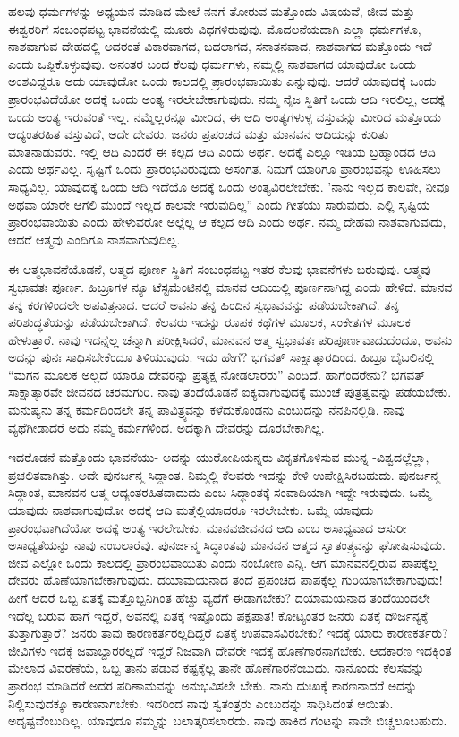 ಹಲವು ಧರ್ಮಗಳನ್ನು ಅಧ್ಯಯನ ಮಾಡಿದ ಮೇಲೆ ನನಗೆ ತೋರುವ ಮತ್ತೊಂದು ವಿಷಯವೆ, ಜೀವ ಮತ್ತು ಈಶ್ವರರಿಗೆ ಸಂಬಂಧಪಟ್ಟ ಭಾವನೆಯಲ್ಲಿ ಮೂರು ವಿಧಗಳಿರುವುವು. ಮೊದಲನೆಯದಾಗಿ ಎಲ್ಲಾ ಧರ್ಮಗಳೂ, ನಾಶವಾಗುವ ದೇಹದಲ್ಲಿ ಅದರಂತೆ ವಿಕಾರವಾಗದ, ಬದಲಾಗದ, ಸನಾತನವಾದ, ನಾಶವಾಗದ ಮತ್ತೊಂದು ಇದೆ ಎಂದು ಒಪ್ಪಿಕೊಳ್ಳುವುವು. ಅನಂತರ ಬಂದ ಕೆಲವು ಧರ್ಮಗಳು, ನಮ್ಮಲ್ಲಿ ನಾಶವಾಗದ ಯಾವುದೋ ಒಂದು ಅಂಶವಿದ್ದರೂ ಅದು ಯಾವುದೋ ಒಂದು ಕಾಲದಲ್ಲಿ ಪ್ರಾರಂಭವಾಯಿತು ಎನ್ನುವುವು. ಆದರೆ ಯಾವುದಕ್ಕೆ ಒಂದು ಪ್ರಾರಂಭವಿದೆಯೋ ಅದಕ್ಕೆ ಒಂದು ಅಂತ್ಯ ಇರಲೇಬೇಕಾಗುವುದು. ನಮ್ಮ ನೈಜ ಸ್ಥಿತಿಗೆ ಒಂದು ಆದಿ ಇರಲಿಲ್ಲ, ಅದಕ್ಕೆ ಒಂದು ಅಂತ್ಯ ಇರುವಂತೆ ಇಲ್ಲ. ನಮ್ಮೆಲ್ಲರನ್ನೂ ಮೀರಿದ, ಈ ಆದಿ ಅಂತ್ಯಗಳುಳ್ಳ ವಸ್ತುವನ್ನು ಮೀರಿದ ಮತ್ತೊಂದು ಆದ್ಯಂತರಹಿತ ವಸ್ತುವಿದೆ, ಅದೇ ದೇವರು. ಜನರು ಪ್ರಪಂಚದ ಮತ್ತು ಮಾನವನ ಆದಿಯನ್ನು ಕುರಿತು ಮಾತನಾಡುವರು. ಇಲ್ಲಿ ಆದಿ ಎಂದರೆ ಈ ಕಲ್ಪದ ಆದಿ ಎಂದು ಅರ್ಥ. ಅದಕ್ಕೆ ಎಲ್ಲೂ ಇಡಿಯ ಬ್ರಹ್ಮಾಂಡದ ಆದಿ ಎಂದು ಅರ್ಥವಿಲ್ಲ. ಸೃಷ್ಟಿಗೆ ಒಂದು ಪ್ರಾರಂಭವಿರುವುದು ಅಸಂಗತ. ನಿಮಗೆ ಯಾರಿಗೂ ಪ್ರಾರಂಭವನ್ನು ಊಹಿಸಲು ಸಾಧ್ಯವಿಲ್ಲ. ಯಾವುದಕ್ಕೆ ಒಂದು ಆದಿ ಇದೆಯೊ ಅದಕ್ಕೆ ಒಂದು ಅಂತ್ಯವಿರಲೇಬೇಕು. 'ನಾನು ಇಲ್ಲದ ಕಾಲವೇ, ನೀವೂ ಅಥವಾ ಯಾರೇ ಆಗಲಿ ಮುಂದೆ ಇಲ್ಲದ ಕಾಲವೇ ಇರುವುದಿಲ್ಲ” ಎಂದು ಗೀತೆಯು ಸಾರುವುದು. ಎಲ್ಲಿ ಸೃಷ್ಟಿಯ ಪ್ರಾರಂಭವಾಯಿತು ಎಂದು ಹೇಳುವರೋ ಅಲ್ಲೆಲ್ಲ ಆ ಕಲ್ಪದ ಆದಿ ಎಂದು ಅರ್ಥ. ನಮ್ಮ ದೇಹವು ನಾಶವಾಗುವುದು, ಆದರೆ ಆತ್ಮವು ಎಂದಿಗೂ ನಾಶವಾಗುವುದಿಲ್ಲ.

ಈ ಆತ್ಮಭಾವನೆಯೊಡನೆ, ಆತ್ಮದ ಪೂರ್ಣ ಸ್ಥಿತಿಗೆ ಸಂಬಂಧಪಟ್ಟ ಇತರ ಕೆಲವು ಭಾವನೆಗಳು ಬರುವುವು. ಆತ್ಮವು ಸ್ವಭಾವತಃ ಪೂರ್ಣ. ಹಿಬ್ರೂಗಳ ನ್ಯೂ ಟೆಸ್ಟಮೆಂಟಿನಲ್ಲಿ ಮಾನವ ಆದಿಯಲ್ಲಿ ಪೂರ್ಣನಾಗಿದ್ದ ಎಂದು ಹೇಳಿದೆ. ಮಾನವ ತನ್ನ ಕರಗಳಿಂದಲೇ ಅಪವಿತ್ರನಾದ. ಆದರೆ ಅವನು ತನ್ನ ಹಿಂದಿನ ಸ್ವಭಾವವನ್ನು ಪಡೆಯಬೇಕಾಗಿದೆ. ತನ್ನ ಪರಿಶುದ್ಧತೆಯನ್ನು ಪಡೆಯಬೇಕಾಗಿದೆ. ಕೆಲವರು ಇದನ್ನು ರೂಪಕ ಕಥೆಗಳ ಮೂಲಕ, ಸಂಕೇತಗಳ ಮೂಲಕ ಹೇಳುತ್ತಾರೆ. ನಾವು ಇದನ್ನೆಲ್ಲ ಚೆನ್ನಾಗಿ ಪರೀಕ್ಷಿಸಿದರೆ, ಮಾನವನ ಆತ್ಮ ಸ್ವಭಾವತಃ ಪರಿಪೂರ್ಣವಾದುದೆಂದೂ, ಅವನು ಅದನ್ನು ಪುನಃ ಸಾಧಿಸಬೇಕೆಂದೂ ತಿಳಿಯುವುದು. ಇದು ಹೇಗೆ? ಭಗವತ್ ಸಾಕ್ಷಾತ್ಕಾರದಿಂದ. ಹಿಬ್ರೂ ಬೈಬಲಿನಲ್ಲಿ “ಮಗನ ಮೂಲಕ ಅಲ್ಲದೆ ಯಾರೂ ದೇವರನ್ನು ಪ್ರತ್ಯಕ್ಷ ನೋಡಲಾರರು'' ಎಂದಿದೆ. ಹಾಗೆಂದರೇನು? ಭಗವತ್ ಸಾಕ್ಷಾತ್ಕಾರವೇ ಜೀವನದ ಚರಮಗುರಿ. ನಾವು ತಂದೆಯೊಡನೆ ಐಕ್ಯವಾಗುವುದಕ್ಕೆ ಮುಂಚೆ ಪುತ್ರತ್ವವನ್ನು ಪಡೆಯಬೇಕು. ಮನುಷ್ಯನು ತನ್ನ ಕರ್ಮದಿಂದಲೇ ತನ್ನ ಪಾವಿತ್ರ್ಯವನ್ನು ಕಳೆದುಕೊಂಡನು ಎಂಬುದನ್ನು ನೆನಪಿನಲ್ಲಿಡಿ. ನಾವು ವ್ಯಥೆಗೀಡಾದರೆ ಅದು ನಮ್ಮ ಕರ್ಮಗಳಿಂದ. ಅದಕ್ಕಾಗಿ ದೇವರನ್ನು ದೂರಬೇಕಾಗಿಲ್ಲ.

ಇದರೊಡನೆ ಮತ್ತೊಂದು ಭಾವನೆಯು- ಅದನ್ನು ಯುರೋಪಿಯನ್ನರು ವಿಕೃತಗೊಳಿಸುವ ಮುನ್ನ -ವಿಶ್ವದಲ್ಲೆಲ್ಲಾ, ಪ್ರಚಲಿತವಾಗಿತ್ತು. ಅದೇ ಪುನರ್ಜನ್ಮ ಸಿದ್ದಾಂತ. ನಿಮ್ಮಲ್ಲಿ ಕೆಲವರು ಇದನ್ನು ಕೇಳಿ ಉಪೇಕ್ಷಿಸಿರಬಹುದು. ಪುನರ್ಜನ್ಮ ಸಿದ್ಧಾಂತ, ಮಾನವನ ಆತ್ಮ ಆದ್ಯಂತರಹಿತವಾದುದು ಎಂಬ ಸಿದ್ಧಾಂತಕ್ಕೆ ಸಂವಾದಿಯಾಗಿ ಇದ್ದೇ ಇರುವುದು. ಒಮ್ಮೆ ಯಾವುದು ನಾಶವಾಗುವುದೋ ಅದಕ್ಕೆ ಆದಿ ಮತ್ತೆಲ್ಲಿಯಾದರೂ ಇರಲೇಬೇಕು. ಒಮ್ಮೆ ಯಾವುದು ಪ್ರಾರಂಭವಾಗಿದೆಯೋ ಅದಕ್ಕೆ ಅಂತ್ಯ ಇರಲೇಬೇಕು. ಮಾನವಜೀವನದ ಆದಿ ಎಂಬ ಅಸಾಧ್ಯವಾದ ಆಸುರೀ ಅಸಾಧ್ಯತೆಯನ್ನು ನಾವು ನಂಬಲಾರೆವು. ಪುನರ್ಜನ್ಮ ಸಿದ್ಧಾಂತವು ಮಾನವನ ಆತ್ಮದ ಸ್ವಾತಂತ್ರ್ಯವನ್ನು ಘೋಷಿಸುವುದು. ಜೀವ ಎಲ್ಲೋ ಒಂದು ಕಾಲದಲ್ಲಿ ಪ್ರಾರಂಭವಾಯಿತು ಎಂದು ನಂಬೋಣ ಎನ್ನಿ. ಆಗ ಮಾನವನಲ್ಲಿರುವ ಪಾಪಕ್ಕೆಲ್ಲ ದೇವರು ಹೊಣೆಯಾಗಬೇಕಾಗುವುದು. ದಯಾಮಯನಾದ ತಂದೆ ಪ್ರಪಂಚದ ಪಾಪಕ್ಕೆಲ್ಲ ಗುರಿಯಾಗಬೇಕಾಗುವುದು! ಹೀಗೆ ಆದರೆ ಒಬ್ಬ ಏತಕ್ಕೆ ಮತ್ತೊಬ್ಬನಿಗಿಂತ ಹೆಚ್ಚು ವ್ಯಥೆಗೆ ಈಡಾಗಬೇಕು? ದಯಾಮಯನಾದ ತಂದೆಯಿಂದಲೇ ಇದೆಲ್ಲ ಬರುವ ಹಾಗೆ ಇದ್ದರೆ, ಅವನಲ್ಲಿ ಏತಕ್ಕೆ ಇಷ್ಟೊಂದು ಪಕ್ಷಪಾತ! ಕೋಟ್ಯಂತರ ಜನರು ಏತಕ್ಕೆ ದೌರ್ಜನ್ಯಕ್ಕೆ ತುತ್ತಾಗುತ್ತಾರೆ? ಜನರು ತಾವು ಕಾರಣಕರ್ತರಲ್ಲದಿದ್ದರೆ ಏತಕ್ಕೆ ಉಪವಾಸವಿರಬೇಕು? ಇದಕ್ಕೆ ಯಾರು ಕಾರಣಕರ್ತರು? ಜೀವಿಗಳು ಇದಕ್ಕೆ ಜವಾಬ್ದಾರರಲ್ಲದೆ ಇದ್ದರೆ ನಿಜವಾಗಿ ದೇವರೇ ಇದಕ್ಕೆ ಹೊಣೆಗಾರನಾಗಬೇಕು. ಆದಕಾರಣ ಇದಕ್ಕಿಂತ ಮೇಲಾದ ವಿವರಣೆಯೆ, ಒಬ್ಬ ತಾನು ಪಡುವ ಕಷ್ಟಕ್ಕೆಲ್ಲ ತಾನೇ ಹೊಣೆಗಾರನೆಂಬುದು. ನಾನೊಂದು ಕೆಲಸವನ್ನು ಪ್ರಾರಂಭ ಮಾಡಿದರೆ ಅದರ ಪರಿಣಾಮವನ್ನು ಅನುಭವಿಸಲೇ ಬೇಕು. ನಾನು ದುಃಖಕ್ಕೆ ಕಾರಣನಾದರೆ ಅದನ್ನು ನಿಲ್ಲಿಸುವುದಕ್ಕೂ ಕಾರಣನಾಗಬೇಕು. ಇದರಿಂದ ನಾವು ಸ್ವತಂತ್ರರು ಎಂಬುದನ್ನು ಸಾಧಿಸಿದಂತೆ ಆಯಿತು. ಅದೃಷ್ಟವೆಂಬುದಿಲ್ಲ. ಯಾವುದೂ ನಮ್ಮನ್ನು ಬಲಾತ್ಕರಿಸಲಾರದು. ನಾವು ಹಾಕಿದ ಗಂಟನ್ನು ನಾವೇ ಬಿಚ್ಚಲೂಬಹುದು.

